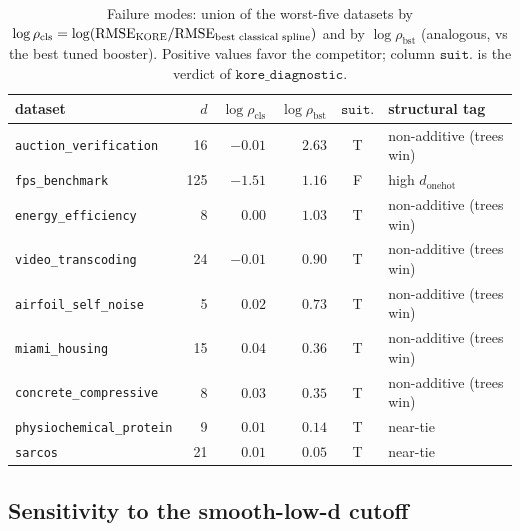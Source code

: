 \documentclass{article}
\newcommand{\KORE}{\textsc{KORE}}
\begin{document}
\begin{table}[h]
\centering
\footnotesize
\setlength{\tabcolsep}{4pt}
\begin{tabular}{lrrrcl}
\toprule
dataset & $d$ & $\log\rho_{\text{cls}}$ & $\log\rho_{\text{bst}}$ & $\texttt{suit.}$ & structural tag \\
\midrule
\texttt{auction\_verification}     & 16  & $-0.01$ & $2.63$  & T & non-additive (trees win) \\
\texttt{fps\_benchmark}            & 125 & $-1.51$ & $1.16$  & F & high $d_{\mathrm{onehot}}$ \\
\texttt{energy\_efficiency}        & 8   & $0.00$  & $1.03$  & T & non-additive (trees win) \\
\texttt{video\_transcoding}        & 24  & $-0.01$ & $0.90$  & T & non-additive (trees win) \\
\texttt{airfoil\_self\_noise}      & 5   & $0.02$  & $0.73$  & T & non-additive (trees win) \\
\texttt{miami\_housing}            & 15  & $0.04$  & $0.36$  & T & non-additive (trees win) \\
\texttt{concrete\_compressive}     & 8   & $0.03$  & $0.35$  & T & non-additive (trees win) \\
\texttt{physiochemical\_protein}   & 9   & $0.01$  & $0.14$  & T & near-tie \\
\texttt{sarcos}                    & 21  & $0.01$  & $0.05$  & T & near-tie \\
\bottomrule
\end{tabular}
\caption{Failure modes: union of the worst-five datasets by $\log\rho_{\text{cls}} = \log(\mathrm{RMSE}_{\KORE{}} / \mathrm{RMSE}_{\text{best classical spline}})$ and by $\log\rho_{\text{bst}}$ (analogous, vs the best tuned booster). Positive values favor the competitor; column $\texttt{suit.}$ is the verdict of $\texttt{kore\_diagnostic}$.}
\label{tab:failure_modes}
\end{table}

\subsection{Sensitivity to the smooth-low-d cutoff}
\label{sec:app_threshold_sensitivity}
\end{document}
